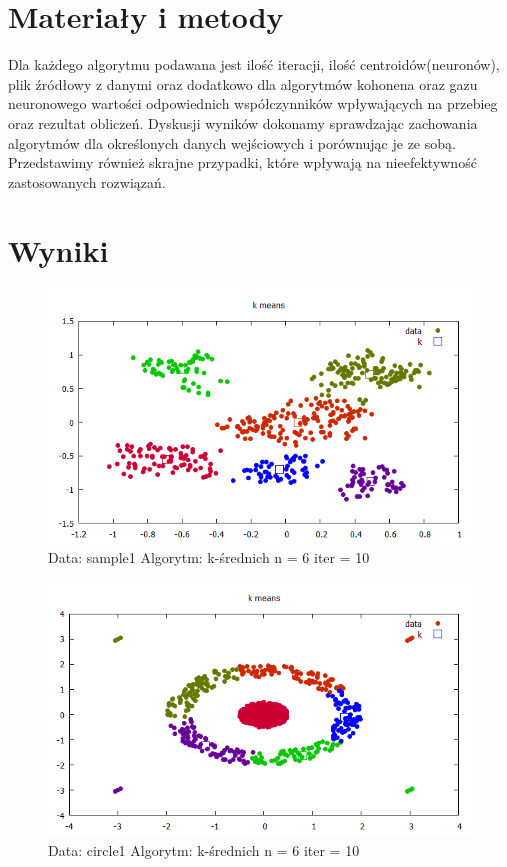 \documentclass{classrep}
\begin{document}
{{\section{Materiały i metody}
{
Dla każdego algorytmu podawana jest ilość iteracji, ilość centroidów(neuronów), plik źródłowy z danymi oraz dodatkowo dla algorytmów kohonena oraz gazu neuronowego wartości odpowiednich współczynników wpływających na przebieg oraz rezultat obliczeń. Dyskusji wyników dokonamy sprawdzając zachowania algorytmów dla określonych danych wejściowych i porównując je ze sobą. Przedstawimy również skrajne przypadki, które wpływają na nieefektywność zastosowanych rozwiązań. }

\section{Wyniki}
{

\begin{figure}[h!]
 \centering
 \includegraphics[width=12cm]{img/kmeanssample1_6_10.png}
 \vspace{-0.3cm}
 \caption{Data: sample1 Algorytm: k-średnich n = 6 iter = 10  }
\end{figure}
 
 
\begin{figure}[h!]
 \centering
 \includegraphics[width=12cm]{img/kmeanscircle1_6_10.png}
 \vspace{-0.3cm}
 \caption{Data: circle1 Algorytm: k-średnich n = 6 iter = 10  }
\end{figure}

}}}
\end{document}
